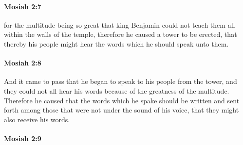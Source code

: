 		\paragraph{Mosiah 2:7} %
			\label{MOSIAH-2-7}
			
			for the multitude being so great
			that king Benjamin could not teach them all within the walls of the temple,
			therefore he caused a tower to be erected,
			that thereby his people might hear the words which he should speak unto them.
			
		\paragraph{Mosiah 2:8} %
			\label{MOSIAH-2-8}
			
			And it came to pass that
			he began to speak to his people from the tower,
			and they could not all hear his words because of the greatness of the multitude.
			Therefore he caused that the words which he spake should be written
			and sent forth among those that were not under the sound of his voice,
			that they might also receive his words.
			
		\paragraph{Mosiah 2:9} %
			\label{MOSIAH-2-9}
			

